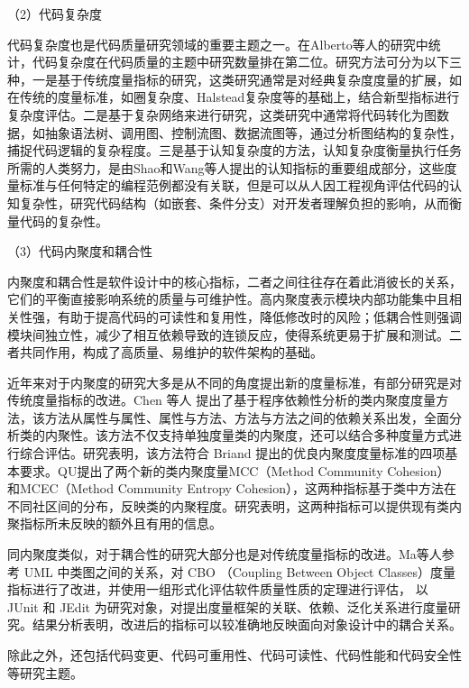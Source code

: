 （2）代码复杂度

代码复杂度也是代码质量研究领域的重要主题之一。在Alberto等人\cite{NUNEZVARELA2017164}的研究中统计，代码复杂度在代码质量的主题中研究数量排在第二位。研究方法可分为以下三种，一是基于传统度量指标的研究，这类研究通常是对经典复杂度度量的扩展，如在传统的度量标准，如圈复杂度、Halstead复杂度等的基础上，结合新型指标进行复杂度评估。二是基于复杂网络来进行研究\cite{2015Exploring, 2012A}，这类研究中通常将代码转化为图数据，如抽象语法树、调用图、控制流图、数据流图等，通过分析图结构的复杂性，捕捉代码逻辑的复杂程度。三是基于认知复杂度的方法，认知复杂度衡量执行任务所需的人类努力\cite{2012Framework, 2012Asuite}，是由Shao和Wang\cite{2010Assessing}等人提出的认知指标的重要组成部分，这些度量标准与任何特定的编程范例都没有关联，但是可以从人因工程视角评估代码的认知复杂性，研究代码结构（如嵌套、条件分支）对开发者理解负担的影响，从而衡量代码的复杂性。


（3）代码内聚度和耦合性

内聚度和耦合性是软件设计中的核心指标，二者之间往往存在着此消彼长的关系，它们的平衡直接影响系统的质量与可维护性。高内聚度表示模块内部功能集中且相关性强，有助于提高代码的可读性和复用性，降低修改时的风险；低耦合性则强调模块间独立性，减少了相互依赖导致的连锁反应，使得系统更易于扩展和测试。二者共同作用，构成了高质量、易维护的软件架构的基础。

近年来对于内聚度的研究大多是从不同的角度提出新的度量标准，有部分研究是对传统度量指标的改进。Chen 等人 \cite{陈振强2003} 提出了基于程序依赖性分析的类内聚度度量方法，该方法从属性与属性、属性与方法、方法与方法之间的依赖关系出发，全面分析类的内聚性。该方法不仅支持单独度量类的内聚度，还可以结合多种度量方式进行综合评估。研究表明，该方法符合 Briand \cite{1997Property} 提出的优良内聚度度量标准的四项基本要求。QU\cite{QU2015193}提出了两个新的类内聚度量MCC（Method Community Cohesion）和MCEC（Method Community Entropy Cohesion），这两种指标基于类中方法在不同社区间的分布，反映类的内聚程度。研究表明，这两种指标可以提供现有类内聚指标所未反映的额外且有用的信息。

同内聚度类似，对于耦合性的研究大部分也是对传统度量指标的改进。Ma等人\cite{马健2018}参考 UML 中类图之间的关系，对 CBO （Coupling Between Object Classes）度量指标进行了改进，并使用一组形式化评估软件质量性质的定理进行评估， 以 JUnit 和 JEdit 为研究对象，对提出度量框架的关联、依赖、泛化关系进行度量研究。结果分析表明，改进后的指标可以较准确地反映面向对象设计中的耦合关系。

除此之外，还包括代码变更、代码可重用性、代码可读性、代码性能和代码安全性等研究主题。

